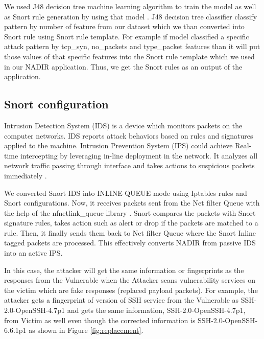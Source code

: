 We used J48 decision tree machine learning algorithm to train the model as well as Snort rule generation by using that model \cite{NIDusingDT}. J48 decision tree classifier classify pattern by number of
feature from our dataset which we than converted into Snort rule using Snort rule template. For example if model classified a specific attack pattern by tcp\_syn, no\_packets and type\_packet features than
it will put those values of that specific features into the Snort rule template which we used in our NADIR application. Thus, we get the Snort rules as an output of the application.



\subsection{Snort configuration}

Intrusion Detection System (IDS) is a device which monitors packets on the computer networks. IDS reports attack behaviors based on rules and signatures applied to the machine. Intrusion Prevention System 
(IPS)  could achieve Real-time intercepting by leveraging in-line deployment in the network. It analyzes all network traffic passing through interface and takes actions to suspicious packets immediately
\cite{misc:netfilter}.

We converted Snort IDS into INLINE QUEUE mode using Iptables rules and Snort configurations. Now, it receives packets sent from the Net filter Queue with the help of the nfnetlink\_queue library 
\cite{misc:netfilter}. Snort compares the packets with Snort signature rules, takes action such as alert or drop if the packets are matched to a rule. Then, it finally sends them back to Net filter Queue 
where the Snort Inline tagged packets are processed. This effectively converts NADIR from passive IDS into an active IPS. 


In this case, the attacker will get the same information or fingerprints as the responses from the Vulnerable when the Attacker scans vulnerability services on the victim which are fake responses (replaced
payload packets). For example, the attacker gets a fingerprint of version of SSH service from the Vulnerable as SSH-2.0-OpenSSH-4.7p1 and gets the same information, SSH-2.0-OpenSSH-4.7p1, from Victim as
well even though the corrected information is SSH-2.0-OpenSSH-6.6.1p1 as shown in Figure \ref{fig:replacement}.


